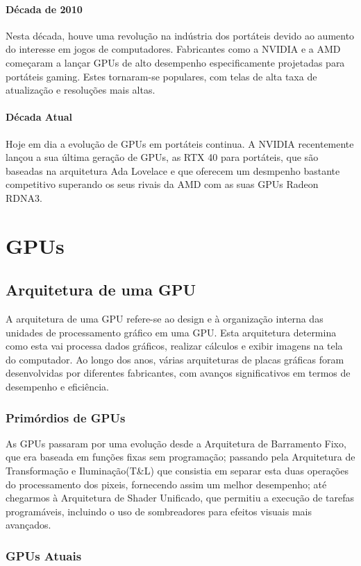 \documentclass[a4paper,11pt,]{report}
\begin{document}
\subsection{Década de 2010}
Nesta década, houve uma revolução na indústria dos portáteis devido ao aumento do interesse em jogos de computadores. Fabricantes como a NVIDIA e a AMD começaram a lançar GPUs de alto desempenho especificamente projetadas para portáteis gaming. Estes tornaram-se populares, com telas de alta taxa de atualização e resoluções mais altas.
\subsection{Década Atual}
Hoje em dia a evolução de GPUs em portáteis continua. A NVIDIA recentemente lançou a sua última geração de GPUs, as RTX 40 para portáteis, que são baseadas na arquitetura Ada Lovelace e que oferecem um desmpenho bastante competitivo superando os seus rivais da AMD com as suas GPUs Radeon RDNA3.

\part{GPUs}

\chapter{Arquitetura de uma GPU}
A arquitetura de uma GPU refere-se ao design e à organização interna das unidades de processamento gráfico em uma GPU. Esta arquitetura determina como esta vai processa dados gráficos, realizar cálculos e exibir imagens na tela do computador. Ao longo dos anos, várias arquiteturas de placas gráficas foram desenvolvidas por diferentes fabricantes, com avanços significativos em termos de desempenho e eficiência.

\section{Primórdios de GPUs}
As GPUs passaram por uma evolução desde a Arquitetura de Barramento Fixo, que era baseada em funções fixas sem programação; passando pela Arquitetura de Transformação e Iluminação(T\&L) que consistia em separar esta duas operações do processamento dos pixeis, fornecendo assim um melhor desempenho; até chegarmos à Arquitetura de Shader Unificado, que permitiu a execução de tarefas programáveis, incluindo o uso de sombreadores para efeitos visuais mais avançados.
\pagebreak
\section{GPUs Atuais}
\end{document}
